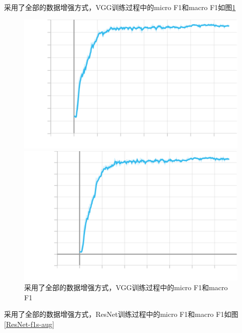 \documentclass{article}
\begin{document}
采用了全部的数据增强方式，VGG训练过程中的micro F1和macro F1如图\ref{VGG-f1s-aug}

\begin{figure}[H]
    \begin{minipage}[H]{0.5\linewidth}
        \centering
        \includegraphics[width=\textwidth]{figures/vgg_aug_microf1score_dev.png}
    \end{minipage}
    \begin{minipage}[H]{0.5\linewidth}
        \centering
        \includegraphics[width=\textwidth]{figures/vgg_aug_macrof1score_dev.png}
    \end{minipage}
    \caption{采用了全部的数据增强方式，VGG训练过程中的micro F1和macro F1}
    \label{VGG-f1s-aug}
\end{figure}

采用了全部的数据增强方式，ResNet训练过程中的micro F1和macro F1如图\ref{ResNet-f1s-aug}
\end{document}
